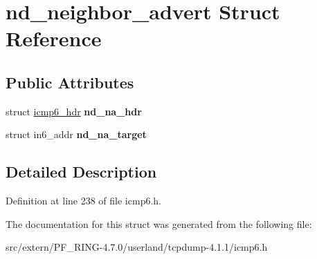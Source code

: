 \hypertarget{structnd__neighbor__advert}{
\section{nd\_\-neighbor\_\-advert Struct Reference}
\label{structnd__neighbor__advert}
}
\subsection*{Public Attributes}
\begin{DoxyCompactItemize}
\item 
\hypertarget{structnd__neighbor__advert_a314beef911c567a391654473027e92d2}{
struct \hyperlink{structicmp6__hdr}{icmp6\_\-hdr} {\bfseries nd\_\-na\_\-hdr}}
\label{structnd__neighbor__advert_a314beef911c567a391654473027e92d2}

\item 
\hypertarget{structnd__neighbor__advert_a017cafd61ae354b8ae2dfeff44b2c0e4}{
struct in6\_\-addr {\bfseries nd\_\-na\_\-target}}
\label{structnd__neighbor__advert_a017cafd61ae354b8ae2dfeff44b2c0e4}

\end{DoxyCompactItemize}


\subsection{Detailed Description}


Definition at line 238 of file icmp6.h.



The documentation for this struct was generated from the following file:\begin{DoxyCompactItemize}
\item 
src/extern/PF\_\-RING-\/4.7.0/userland/tcpdump-\/4.1.1/icmp6.h\end{DoxyCompactItemize}
